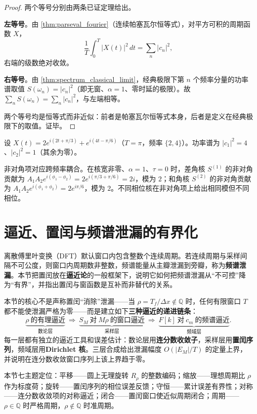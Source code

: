 \begin{proof}
两个等号分别由两条已证定理给出。

\textbf{左等号}。由 \cref{thm:parseval_fourier}（连续帕塞瓦尔恒等式），对平方可积的周期函数 $X$，
\[
\frac{1}{T}\int_0^T |X(t)|^2\,dt = \sum_{n} |c_n|^2 ,
\]
右端的级数绝对收敛。

\textbf{右等号}。由 \cref{thm:spectrum_classical_limit}，经典极限下第 $n$ 个频率分量的功率谱取值 $S(\omega_n) = |c_n|^2$（即无窗、$\alpha = 1$、零时延的极限）。故 $\sum_n S(\omega_n) = \sum_n |c_n|^2$，与左端相等。

两个等号均是恒等式而非近似：前者是帕塞瓦尔恒等式本身，后者是定义在经典极限下的取值。证毕。
\end{proof}

\begin{example}[功率谱的核族对比]\label{ex:spectrum_family}
设 $X(t) = 2e^{i(2t + \pi/3)} + e^{i(4t - \pi/6)}$（$T = \pi$，频率 $\{2, 4\}$）。功率谱为 $|c_1|^2 = 4$、$|c_2|^2 = 1$（其余为零）。

非对角项对应跨频率耦合。在核宽非零、$\alpha = 1$、$\tau = 0$ 时，差角核 $S^{(1)}$ 的非对角贡献为 $A_1 A_2 e^{i(\phi_1 - \phi_2)} = 2 e^{i(\pi/3 + \pi/6)} = 2i$，模为 $2$；和角核 $S^{(2)}$ 的非对角贡献为 $A_1 A_2 e^{i(\phi_1 + \phi_2)} = 2e^{i\pi/6}$，模为 $2$。不同相位核在非对角项上给出相同模但不同相位。
\end{example}

\section{\texorpdfstring{逼近、置闰与频谱泄漏的有界化}{逼近、置闰与频谱泄漏的有界化}}\label{sec:intercalation_spectral_leakage}

\begin{remark}[本节定位]\label{rem:intercalation_leakage_positioning}
离散傅里叶变换（DFT）默认窗口内包含整数个连续周期。若连续周期与采样间隔不可公度，则窗口内周期数非整数，频谱能量从主瓣泄漏到旁瓣，称为\textbf{频谱泄漏}。本节把置闰放在\textbf{逼近论}的一般框架下，说明它如何把频谱泄漏从“不可控”降为“有界”，并指出置闰与窗函数是互补而非替代的关系。

本节的核心不是声称置闰“消除”泄漏——当 $\rho=T_f/\Delta x\notin\mathbb{Q}$ 时，任何有限窗口 $T$ 都不能使泄漏严格为零——而是建立如下\textbf{三种逼近的递进链条}：
\[
\underbrace{\rho\ \text{的有理逼近}}_{\text{数论层}}
\ \Longrightarrow\
\underbrace{S_M\ \text{对}\ M\rho\ \text{的窗口逼近}}_{\text{采样层}}
\ \Longrightarrow\
\underbrace{F[k]\ \text{对}\ c_m\ \text{的频谱逼近}}_{\text{频域层}}.
\]
每一层都有独立的逼近工具和误差估计：数论层用\textbf{连分数收敛子}，采样层用\textbf{置闰序列}，频域层用\textbf{Dirichlet 核}。三层合成给出泄漏幅度 $O(|E_M|/T)$ 的定量上界，并说明在连分数收敛窗口序列上该上界趋于零。

本节七主题定位：平移——圆上无理旋转 $R_\rho$ 的整数编码；缩放——理想周期比 $\rho$ 作为标度荷；旋转——置闰序列的相位误差反馈；守恒——累计误差有界性；对称——连分数收敛项的对称逼近；闭合——置闰窗口使近似周期闭合；周期——$\rho\in\mathbb{Q}$ 时严格周期，$\rho\notin\mathbb{Q}$ 时准周期。
\end{remark}


